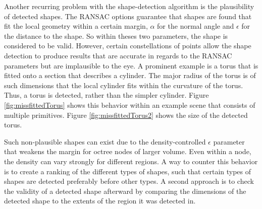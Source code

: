 \par

Another recurring problem with the shape-detection algorithm is the plausibility of detected shapes. The RANSAC options guarantee that shapes are found that fit the local geometry within a certain margin, $\alpha$ for the normal angle and $\epsilon$ for the distance to the shape. So within theses two parameters, the shape is considered to be valid. However, certain constellations of points allow the shape detection to produce results that are accurate in regards to the RANSAC parameters but are implausible to the eye. A prominent example is a torus that is fitted onto a section that describes a cylinder. The major radius of the torus is of such dimensions that the local cylinder fits within the curvature of the torus. Thus, a torus is detected, rather than the simpler cylinder. Figure \ref{fig:missfittedTorus} shows this behavior within an example scene that consists of multiple primitives. Figure \ref{fig:missfittedTorus2} shows the size of the detected torus. 

\par

Such non-plausible shapes can exist due to the density-controlled $\epsilon$ parameter that weakens the margin for octree nodes of larger volume. Even within a node, the density can vary strongly for different regions. A way to counter this behavior is to create a ranking of the different types of shapes, such that certain types of shapes are detected preferably before other types. A second approach is to check the validity of a detected shape afterward by comparing the dimensions of the detected shape to the extents of the region it was detected in. 

